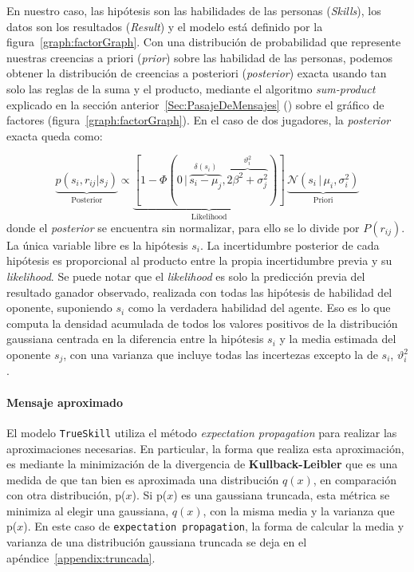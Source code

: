 \documentclass[11pt,twoside,spanish]{report} %
\begin{document}
En nuestro caso, las hip\'otesis son las habilidades de las personas (\textit{Skills}), los datos son los resultados (\textit{Result}) y el modelo est\'a definido por la figura~\ref{graph:factorGraph}.
Con una distribuci\'on de probabilidad que represente nuestras creencias a priori (\textit{prior}) sobre las habilidad de las personas, podemos obtener la distribuci\'on de creencias a posteriori (\textit{posterior}) exacta usando tan solo las reglas de la suma y el producto, mediante el algoritmo \textit{sum-product} explicado en la secci\'on anterior~\ref{Sec:PasajeDeMensajes} () sobre el gr\'afico de factores (figura~\ref{graph:factorGraph}).
En el caso de dos jugadores, la \textit{posterior} exacta queda como:

\begin{equation}\label{eq:bayesaprox}
\underbrace{p(s_i, r_{ij}| s_j)}_{\text{Posterior}} \propto
 \underbrace{[1 - \Phi(0 \, | \, \overbrace{s_i - \mu_j}^{\delta(s_i)},  \overbrace{ 2\beta^2 + \sigma_j^2}^{\vartheta_i^2})]}_{\text{Likelihood}} \,  \underbrace{\mathcal{N}(s_i \, | \, \mu_i, \sigma_i^2 )}_{\text{Priori}}
\end{equation}
donde el \textit{posterior} se encuentra sin normalizar, para ello se lo divide por $P(r_{ij})$.
La \'unica variable libre es la hip\'otesis $s_i$.
La incertidumbre posterior de cada hip\'otesis es proporcional al producto entre la propia incertidumbre previa y su \textit{likelihood}.
Se puede notar que el \textit{likelihood} es solo la predicci\'on previa del resultado ganador observado, realizada con todas las hip\'otesis de habilidad del oponente, suponiendo $s_i$ como la verdadera habilidad del agente.
Eso es lo que computa la densidad acumulada de todos los valores positivos de la distribuci\'on gaussiana centrada en la diferencia entre la hip\'otesis $s_i$ y la media estimada del oponente $s_j$, con una varianza que incluye todas las incertezas excepto la de $s_i$, $\vartheta_i^2$.

\paragraph{Mensaje aproximado}

El modelo \texttt{TrueSkill} utiliza el m\'etodo \textit{expectation propagation} para realizar las aproximaciones necesarias.
En particular, la forma que realiza esta aproximaci\'on, es mediante la minimizaci\'on de la divergencia de \textbf{Kullback-Leibler} que es una medida de que tan bien es aproximada una distribuci\'on $q(x)$, en comparaci\'on con otra distribuci\'on, p($x$).
Si p($x$) es una gaussiana truncada, esta m\'etrica se minimiza al elegir una gaussiana, $q(x)$, con la misma media y la varianza que p($x$).
En este caso de \texttt{expectation propagation}, la forma de calcular la media y varianza de una distribuci\'on gaussiana truncada se deja en el ap\'endice~\ref{appendix:truncada}.
\end{document}
